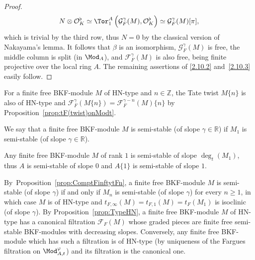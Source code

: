 \begin{proof}
\[
N\otimes\mathcal{O}_{K}^{\flat}\simeq\Tor_{1}^{A}\left(\mathcal{G}_{F}^{\gamma}(M),\mathcal{O}_{K}^{\flat}\right)\simeq\mathcal{G}_{F}^{\gamma}(M)[\pi],
\]
which is trivial by the third row, thus $N=0$ by the classical version of Nakayama's lemma. It follows that $\beta$ is an isomorphism, $\mathcal{G}_{F}^{\gamma}(M)$ is free, the middle column is split (in $\Mod_{A}$), and $\mathcal{F}_{F}^{\gamma}(M)$ is also free, being finite projective over the local ring $A$. The remaining assertions of \eqref{2.10.2} and~\eqref{2.10.3} easily follow.
\end{proof}

\begin{rema}
For a finite free BKF-module $M$ of HN-type and $n\in\mathbb{Z}$, the Tate twist $M\{n\}$ is also of HN-type and $\mathcal{F}_{F}^{\gamma}(M\{n\})=\mathcal{F}_{F}^{\gamma-n}(M)\{n\}$ by Proposition~\ref{prop:tF(twist)onModt}.
\end{rema}

\begin{defi}
We say that a finite free BKF-module $M$ is semi-stable (of slope $\gamma\in\mathbb{R}$) if $M_{1}$ is semi-stable (of slope $\gamma\in\mathbb{R}$).
\end{defi}

\begin{example}
Any finite free BKF-module $M$ of rank $1$ is semi-stable of slope $\deg_{t}(M_{1})$, thus $A$ is semi-stable of slope $0$ and $A\{1\}$ is semi-stable of slope $1$.
\end{example}

By~Proposition~\ref{prop:ComptFinftytFn}, a finite free BKF-module $M$ is semi-stable (of slope $\gamma$) if and only if $M_{n}$ is semi-stable (of slope $\gamma$) for every $n\geq1$, in which case $M$ is of HN-type and $t_{F,\infty}(M)=t_{F,1}(M)=t_{F}(M_{1})$ is isoclinic (of slope $\gamma$). By Proposition~\ref{prop:TypeHN}, a finite free BKF-module $M$ of HN-type has a canonical filtration $\mathcal{F}_{F}(M)$ whose graded pieces are finite free semi-stable BKF-modules with decreasing slopes. Conversely, any finite free BKF-module which has such a filtration is of HN-type (by uniqueness of the Fargues filtration on $\Mod_{A,t}^{\varphi}$) and its filtration is the canonical one.

\subsubsection{}\label{subsec:DefFullSubCatHNType}

